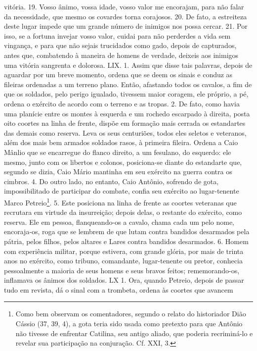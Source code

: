 vitória. 19. Vosso ânimo, vossa idade, vosso valor me encorajam, para não falar
da necessidade, que mesmo os covardes torna corajosos. 20. De fato, a
estreiteza deste lugar impede que um grande número de inimigos nos possa
cercar. 21. Por isso, se a fortuna invejar vosso valor, cuidai para não
perderdes a vida sem vingança, e para que não sejais trucidados como gado,
depois de capturados, antes que, combatendo à maneira de homens de verdade,
deixeis aos inimigos uma vitória sangrenta e dolorosa.  LIX. 1. Assim que disse
tais palavras, depois de aguardar por um breve momento, ordena que se deem os
sinais e conduz as fileiras ordenadas a um terreno plano. Então, afastando
todos os cavalos, a fim de que os soldados, pelo perigo igualado, tivessem
maior coragem, ele próprio, a pé, ordena o exército de acordo com o terreno e
as tropas. 2. De fato, como havia uma planície entre os montes à esquerda e um
rochedo escarpado à direita, posta oito coortes na linha de frente, dispõe em
formação mais cerrada os estandartes das demais como reserva. Leva os seus
centuriões, todos eles seletos e veteranos, além dos mais bem armados soldados
rasos, à primeira fileira. Ordena a Caio Mânlio que se encarregue do flanco
direito, a um fesulano, do esquerdo: ele mesmo, junto com os libertos e
colonos, posiciona-se diante do estandarte que, segundo se dizia, Caio Mário
mantinha em seu exército na guerra contra os cimbros. 4. Do outro lado, no
entanto, Caio Antônio, sofrendo de gota, impossibilitado de participar do
combate, confia seu exército ao lugar-tenente Marco Petreio\footnote{Como bem
observam os comentadores, segundo o relato do historiador Dião Cássio (37, 39,
4), a gota teria sido usada como pretexto para que Antônio não tivesse de
enfrentar Catilina, seu antigo aliado, que poderia recriminá-lo e revelar sua
participação na conjuração. Cf. XXI, 3.}. 5. Este posiciona na linha de frente
as coortes veteranas que recrutara em virtude da insurreição; depois delas, o
restante do exército, como reserva. Ele em pessoa, flanqueando-os a cavalo,
chama cada um pelo nome, encoraja-os, roga que se lembrem de que lutam contra
bandidos desarmados pela pátria, pelos filhos, pelos altares e Lares contra
bandidos desarmados. 6. Homem
com experiência militar, porque estivera, com grande glória, por mais de trinta
anos no exército, como tribuno, comandante, lugar-tenente ou pretor, conhecia  pessoalmente a
maioria de seus homens e seus bravos feitos; rememorando-os,
inflamava os ânimos dos soldados.  LX 1. Ora, quando Petreio, depois de passar
tudo em revista, dá o sinal com a trombeta, ordena às coortes que avancem
